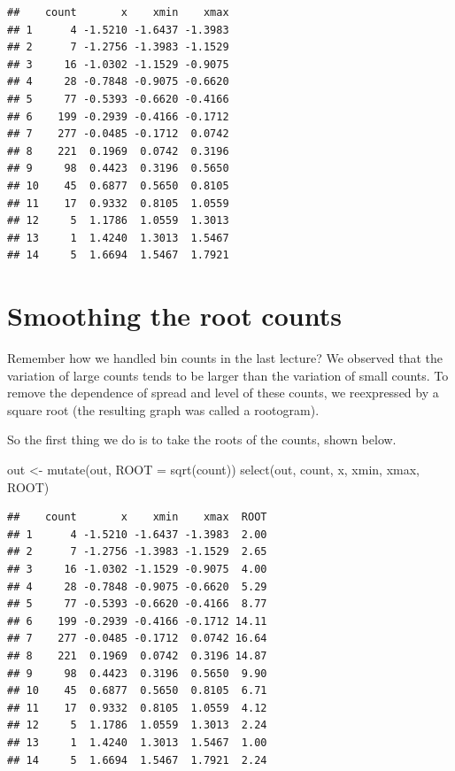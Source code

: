 \documentclass[
]{book}
\newenvironment{Shaded}{\begin{snugshade}}{\end{snugshade}}
\newcommand{\AttributeTok}[1]{\textcolor[rgb]{0.77,0.63,0.00}{#1}}
\newcommand{\FunctionTok}[1]{\textcolor[rgb]{0.00,0.00,0.00}{#1}}
\newcommand{\NormalTok}[1]{#1}
\newcommand{\OtherTok}[1]{\textcolor[rgb]{0.56,0.35,0.01}{#1}}
\begin{document}
\begin{verbatim}
##    count       x    xmin    xmax
## 1      4 -1.5210 -1.6437 -1.3983
## 2      7 -1.2756 -1.3983 -1.1529
## 3     16 -1.0302 -1.1529 -0.9075
## 4     28 -0.7848 -0.9075 -0.6620
## 5     77 -0.5393 -0.6620 -0.4166
## 6    199 -0.2939 -0.4166 -0.1712
## 7    277 -0.0485 -0.1712  0.0742
## 8    221  0.1969  0.0742  0.3196
## 9     98  0.4423  0.3196  0.5650
## 10    45  0.6877  0.5650  0.8105
## 11    17  0.9332  0.8105  1.0559
## 12     5  1.1786  1.0559  1.3013
## 13     1  1.4240  1.3013  1.5467
## 14     5  1.6694  1.5467  1.7921
\end{verbatim}

\hypertarget{smoothing-the-root-counts}{%
\section{Smoothing the root counts}\label{smoothing-the-root-counts}}

Remember how we handled bin counts in the last lecture? We observed that the variation of large counts tends to be larger than the variation of small counts. To remove the dependence of spread and level of these counts, we reexpressed by a square root (the resulting graph was called a rootogram).

So the first thing we do is to take the roots of the counts, shown below.

\begin{Shaded}
\begin{Highlighting}[]
\NormalTok{out }\OtherTok{\textless{}{-}} \FunctionTok{mutate}\NormalTok{(out, }\AttributeTok{ROOT =} \FunctionTok{sqrt}\NormalTok{(count))}
\FunctionTok{select}\NormalTok{(out, count, x, xmin, xmax, ROOT)}
\end{Highlighting}
\end{Shaded}

\begin{verbatim}
##    count       x    xmin    xmax  ROOT
## 1      4 -1.5210 -1.6437 -1.3983  2.00
## 2      7 -1.2756 -1.3983 -1.1529  2.65
## 3     16 -1.0302 -1.1529 -0.9075  4.00
## 4     28 -0.7848 -0.9075 -0.6620  5.29
## 5     77 -0.5393 -0.6620 -0.4166  8.77
## 6    199 -0.2939 -0.4166 -0.1712 14.11
## 7    277 -0.0485 -0.1712  0.0742 16.64
## 8    221  0.1969  0.0742  0.3196 14.87
## 9     98  0.4423  0.3196  0.5650  9.90
## 10    45  0.6877  0.5650  0.8105  6.71
## 11    17  0.9332  0.8105  1.0559  4.12
## 12     5  1.1786  1.0559  1.3013  2.24
## 13     1  1.4240  1.3013  1.5467  1.00
## 14     5  1.6694  1.5467  1.7921  2.24
\end{verbatim}
\end{document}
